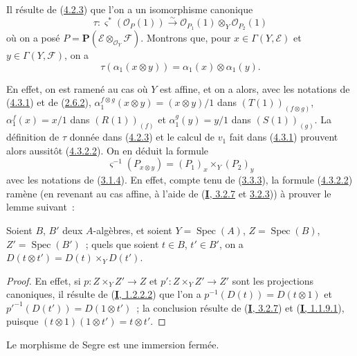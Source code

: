 \begin{env}[4.3.2]
\label{II.4.3.2-fr}
Il résulte de (\hyperref[II.4.2.3-fr]{4.2.3}) que l'on a un isomorphisme
canonique
\[
\label{II.4.3.2.1-fr}
  \tau:\varsigma^*(\mathcal{O}_P(1))\xrightarrow{\sim}
  \mathcal{O}_{P_1}(1)\otimes_Y\mathcal{O}_{P_2}(1)
\tag{4.3.2.1}
\]
où on a posé
$P=\mathbf{P}(\mathcal{E}\otimes_{\mathcal{O}_Y}\mathcal{F})$. Montrons
que, pour $x\in\Gamma(Y,\mathcal{E})$ et
$y\in\Gamma(Y,\mathcal{F})$, on a
\[
\label{II.4.3.2.2-fr}
  \tau(\alpha_1(x\otimes y))=\alpha_1(x)\otimes\alpha_1(y).
\tag{4.3.2.2}
\]

En effet, on est ramené au cas où $Y$ est affine, et on a alors, avec les
notations de (\hyperref[II.4.3.1-fr]{4.3.1}) et de
(\hyperref[II.2.6.2-fr]{2.6.2}),
$\alpha_1^{f\otimes g}(x\otimes y)=(x\otimes y)/1$ dans
$(T(1))_{(f\otimes g)}$, $\alpha_1^f(x)=x/1$ dans $(R(1))_{(f)}$ et
$\alpha_1^g(y)=y/1$ dans $(S(1))_{(g)}$. La définition de $\tau$ donnée dans
(\hyperref[II.4.2.3-fr]{4.2.3}) et le calcul de $v_1$ fait dans
(\hyperref[II.4.3.1-fr]{4.3.1}) prouvent alors aussitôt
(\hyperref[II.4.3.2.2-fr]{4.3.2.2}). On en déduit la formule
\[
\label{II.4.3.2.3-fr}
  \varsigma^{-1}(P_{x\otimes y})=(P_1)_x\times_Y(P_2)_y
\tag{4.3.2.3}
\]
avec les notations de (\hyperref[II.3.1.4-fr]{3.1.4}). En effet, compte tenu
de (\hyperref[II.3.3.3-fr]{3.3.3}), la formule
(\hyperref[II.4.3.2.2-fr]{4.3.2.2}) ramène (en revenant au cas affine, à
l'aide de (\hyperref[I.3.2.7-fr]{\textbf{I}, 3.2.7} et
\hyperref[I.3.2.3-fr]{3.2.3})) à prouver le lemme suivant~:

\begin{lemma}[4.3.2.4]
\label{II.4.3.2.4-fr}
Soient $B$, $B'$ deux $A$-algèbres, et soient
$Y=\operatorname{Spec}(A)$, $Z=\operatorname{Spec}(B)$,
$Z'=\operatorname{Spec}(B')$~; quels que soient $t\in B$, $t'\in B'$, on a
$D(t\otimes t')=D(t)\times_YD(t')$.
\end{lemma}

\begin{proof}
En effet, si $p:Z\times_YZ'\to Z$ et $p':Z\times_YZ'\to Z'$ sont les
projections canoniques, il résulte de
(\hyperref[I.1.2.2.2-fr]{\textbf{I}, 1.2.2.2}) que l'on a
$p^{-1}(D(t))=D(t\otimes1)$ et
$p'^{-1}(D(t'))=D(1\otimes t')$~; la conclusion résulte de
(\hyperref[I.3.2.7-fr]{\textbf{I}, 3.2.7}) et
(\hyperref[I.1.1.9.1-fr]{\textbf{I}, 1.1.9.1}), puisque
$(t\otimes1)(1\otimes t')=t\otimes t'$.
\end{proof}
\end{env}

\begin{proposition}[4.3.3]
\label{II.4.3.3-fr}
Le morphisme de Segre est une immersion fermée.
\end{proposition}

